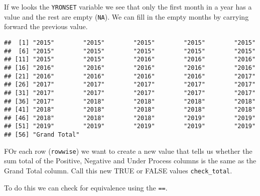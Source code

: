 \documentclass[]{article}
\newenvironment{Shaded}{\begin{snugshade}}{\end{snugshade}}
\newcommand{\CommentTok}[1]{\textcolor[rgb]{0.56,0.35,0.01}{\textit{#1}}}
\newcommand{\DataTypeTok}[1]{\textcolor[rgb]{0.13,0.29,0.53}{#1}}
\newcommand{\KeywordTok}[1]{\textcolor[rgb]{0.13,0.29,0.53}{\textbf{#1}}}
\newcommand{\NormalTok}[1]{#1}
\newcommand{\OperatorTok}[1]{\textcolor[rgb]{0.81,0.36,0.00}{\textbf{#1}}}
\newcommand{\OtherTok}[1]{\textcolor[rgb]{0.56,0.35,0.01}{#1}}
\newcommand{\StringTok}[1]{\textcolor[rgb]{0.31,0.60,0.02}{#1}}
\begin{document}
If we looks the \texttt{YRONSET} variable we see that only the first
month in a year has a value and the rest are empty (\texttt{NA}). We can
fill in the empty months by carrying forward the previous value.

\begin{Shaded}
\end{Shaded}

\begin{verbatim}
##  [1] "2015"        "2015"        "2015"        "2015"        "2015"       
##  [6] "2015"        "2015"        "2015"        "2015"        "2015"       
## [11] "2015"        "2015"        "2016"        "2016"        "2016"       
## [16] "2016"        "2016"        "2016"        "2016"        "2016"       
## [21] "2016"        "2016"        "2016"        "2016"        "2017"       
## [26] "2017"        "2017"        "2017"        "2017"        "2017"       
## [31] "2017"        "2017"        "2017"        "2017"        "2017"       
## [36] "2017"        "2018"        "2018"        "2018"        "2018"       
## [41] "2018"        "2018"        "2018"        "2018"        "2018"       
## [46] "2018"        "2018"        "2018"        "2019"        "2019"       
## [51] "2019"        "2019"        "2019"        "2019"        "2019"       
## [56] "Grand Total"
\end{verbatim}

FOr each row (\texttt{rowwise}) we want to create a new value that tells
us whether the sum total of the Positive, Negative and Under Process
columns is the same as the Grand Total column. Call this new TRUE or
FALSE values \texttt{check\_total}.

To do this we can check for equivalence using the \texttt{==}.

\begin{Shaded}
\end{Shaded}
\end{document}
